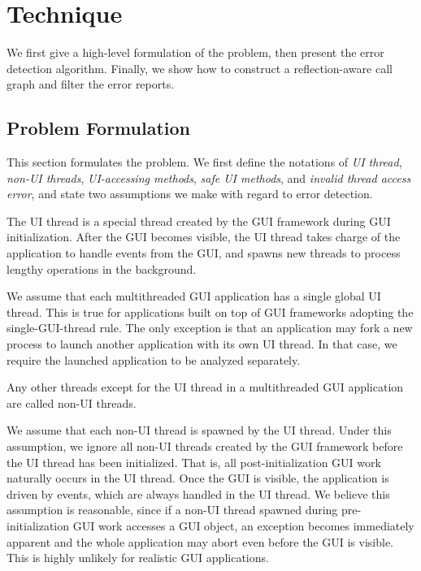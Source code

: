 \section{Technique}
\label{sec:technique}

We first give a high-level formulation of the problem, then present
the error detection algorithm. Finally, we show how to 
construct a reflection-aware call graph and filter the error reports.


\subsection{Problem Formulation}

This section formulates the problem. We first define the
notations of \textit{UI thread}, \textit{non-UI threads},
\textit{UI-accessing methods},
 \textit{safe UI methods}, and \textit{invalid thread access error}, and
state two assumptions we make with regard to error detection.

 {The UI thread
is a special thread created by the GUI framework during
GUI initialization. After the GUI becomes visible, the UI thread
takes charge of the application to handle events from the GUI,
and spawns new threads to process lengthy operations in the background. }\vspace{1mm}

 {We assume that each multithreaded
GUI application has a single global UI thread. This is true for applications
built on top of GUI frameworks adopting the single-GUI-thread rule. The
only exception is that 
 an application may fork a new process to launch another
application with its own UI thread. In that case, we require the
launched application to be analyzed separately.}\vspace{1mm}

 {Any other
threads except for the UI thread in a multithreaded GUI application
 are called non-UI threads.}\vspace{1mm}

 { We assume that each non-UI
thread is spawned by the UI thread. Under this assumption,
we ignore all non-UI threads created by the GUI framework
before the UI thread has been initialized. That is, all post-initialization
GUI work naturally occurs in the UI thread. Once the GUI is visible, the
application is driven by events, which are always handled in the UI thread.
We believe this assumption is reasonable, since if a non-UI thread 
spawned during pre-initialization GUI work accesses a GUI object, an exception becomes
immediately apparent and the whole application may abort even before the
GUI is visible. This is highly unlikely for realistic GUI
applications.
}\vspace{1mm}

